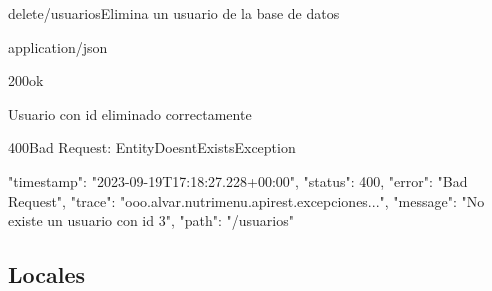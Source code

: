 \begin{apiRoute}{delete}{/usuarios}{Elimina un usuario de la base de datos}
	\begin{routeParameter}
	\end{routeParameter}
	\begin{routeResponse}{application/json}
		\begin{routeResponseItem}{200}{ok}
			\begin{routeResponseItemBody}
Usuario con id eliminado correctamente	
			\end{routeResponseItemBody}
		\end{routeResponseItem}
		
	\begin{routeResponseItem}{400}{Bad Request: EntityDoesntExistsException}
			\begin{routeResponseItemBody}
{
    "timestamp": "2023-09-19T17:18:27.228+00:00",
    "status": 400,
    "error": "Bad Request",
    "trace": "ooo.alvar.nutrimenu.apirest.excepciones...",
    "message": "No existe un usuario con id 3",
    "path": "/usuarios"
}
			\end{routeResponseItemBody}
		\end{routeResponseItem}
		
	\end{routeResponse}
\end{apiRoute}

\subsection{Locales}

